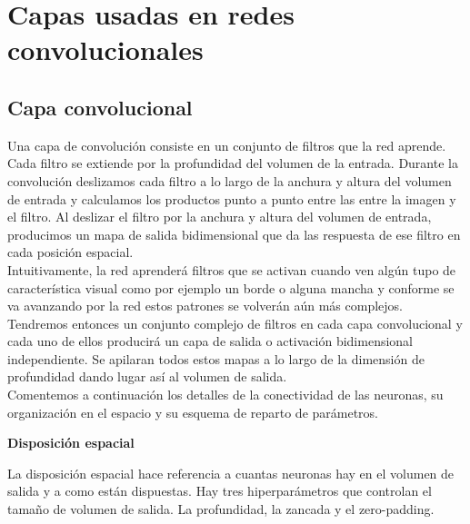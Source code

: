 \section{Capas usadas en redes convolucionales}

     \subsection{Capa convolucional}
  
        
        Una capa de convolución consiste en un conjunto de filtros que la red aprende. Cada filtro se extiende por la profundidad del volumen de la entrada. Durante la convolución deslizamos cada filtro a lo largo de la anchura y altura del volumen de entrada y calculamos los productos punto a punto entre las entre la imagen y el filtro. Al deslizar el filtro por la anchura y altura del volumen de entrada, producimos un mapa de salida bidimensional que da las respuesta de ese filtro en cada posición espacial. \\
        
        Intuitivamente, la red aprenderá filtros que se activan cuando ven algún tupo de característica visual como por ejemplo un borde o alguna mancha y conforme se va avanzando por la red estos patrones se volverán aún más complejos. Tendremos entonces un conjunto complejo de filtros en cada capa convolucional y cada uno de ellos producirá un capa de salida o activación bidimensional independiente. Se apilaran todos estos mapas a lo largo de la dimensión de profundidad dando lugar así al volumen de salida.  \\
        
        Comentemos a continuación los detalles de la conectividad de las neuronas, su organización en el espacio y su esquema de reparto de parámetros. \\
        
        \begin{center}
            \textbf{Disposición espacial}
        \end{center}
        
        La disposición espacial hace referencia a cuantas neuronas hay en el volumen de salida y a como están dispuestas. Hay tres hiperparámetros que controlan el tamaño de volumen de salida. La profundidad, la zancada y el zero-padding. \\
        

